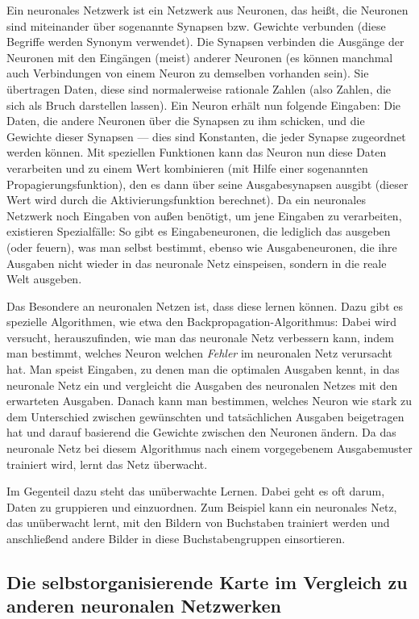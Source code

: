 \documentclass[twoside,a4paper,draft]{article}
\begin{document}
Ein neuronales Netzwerk ist ein Netzwerk aus Neuronen, das heißt, die Neuronen sind miteinander über sogenannte Synapsen bzw. Gewichte verbunden (diese Begriffe werden Synonym verwendet). Die Synapsen verbinden die Ausgänge der Neuronen mit den Eingängen (meist) anderer Neuronen (es können manchmal auch Verbindungen von einem Neuron zu demselben vorhanden sein). Sie übertragen Daten, diese sind normalerweise rationale Zahlen (also Zahlen, die sich als Bruch darstellen lassen). Ein Neuron erhält nun folgende Eingaben: Die Daten, die andere Neuronen über die Synapsen zu ihm schicken, und die \glqq{}Gewichte\grqq{} dieser Synapsen --- dies sind Konstanten, die jeder Synapse zugeordnet werden können. Mit speziellen Funktionen kann das Neuron nun diese Daten verarbeiten und zu einem Wert kombinieren (mit Hilfe einer sogenannten Propagierungsfunktion), den es dann über seine Ausgabesynapsen ausgibt (dieser Wert wird durch die Aktivierungsfunktion berechnet). Da ein neuronales Netzwerk noch Eingaben von außen benötigt, um jene Eingaben zu verarbeiten, existieren Spezialfälle: So gibt es Eingabeneuronen, die lediglich das ausgeben (oder \glqq{}feuern\grqq{}), was man selbst bestimmt, ebenso wie Ausgabeneuronen, die ihre Ausgaben nicht wieder in das neuronale Netz einspeisen, sondern in die reale Welt ausgeben.

Das Besondere an neuronalen Netzen ist, dass diese lernen können. Dazu gibt es spezielle Algorithmen, wie etwa den Backpropagation-Algorithmus: Dabei wird versucht, herauszufinden, wie man das neuronale Netz verbessern kann, indem man bestimmt, welches Neuron welchen \emph{Fehler} im neuronalen Netz verursacht hat. Man speist Eingaben, zu denen man die optimalen Ausgaben kennt, in das neuronale Netz ein und vergleicht die Ausgaben des neuronalen Netzes mit den erwarteten Ausgaben. Danach kann man bestimmen, welches Neuron wie stark zu dem Unterschied zwischen gewünschten und tatsächlichen Ausgaben beigetragen hat und darauf basierend die Gewichte zwischen den Neuronen ändern. Da das neuronale Netz bei diesem Algorithmus nach einem vorgegebenem Ausgabemuster trainiert wird, lernt das Netz \glqq{}überwacht\grqq{}.

Im Gegenteil dazu steht das unüberwachte Lernen. Dabei geht es oft darum, Daten zu gruppieren und einzuordnen. Zum Beispiel kann ein neuronales Netz, das unüberwacht lernt, mit den Bildern von Buchstaben trainiert werden und anschließend andere Bilder in diese Buchstabengruppen einsortieren.

\subsection{Die selbstorganisierende Karte im Vergleich zu anderen neuronalen Netzwerken}
\end{document}
